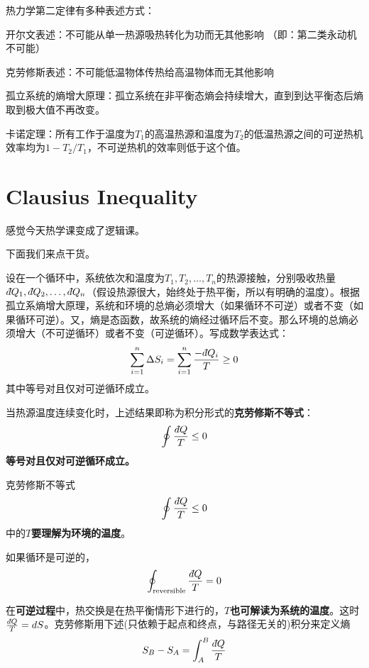 \documentclass[CJK]{beamer}
\begin{document}
\begin{frame}
\bch
热力学第二定律有多种表述方式：
\bitem
\item{开尔文表述：不可能从单一热源吸热转化为功而无其他影响 （即：第二类永动机不可能）}
\item{克劳修斯表述：不可能低温物体传热给高温物体而无其他影响}
\item{孤立系统的熵增大原理：孤立系统在非平衡态熵会持续增大，直到到达平衡态后熵取到极大值不再改变。}
\item{卡诺定理：所有工作于温度为$T_1$的高温热源和温度为$T_2$的低温热源之间的可逆热机效率均为$1-T_2/T_1$，不可逆热机的效率则低于这个值。}
\eitem
\ech
\end{frame}

\section{Clausius Inequality}

\begin{frame}
\bch
\wulian 感觉今天热学课变成了逻辑课。

\skiplines

下面我们来点干货。
\ech
\end{frame}

\begin{frame}
\bch
设在一个循环中，系统依次和温度为$T_1, T_2, \ldots, T_n$的热源接触，分别吸收热量$\dbar Q_1, \dbar Q_2, \ldots, \dbar Q_n$（假设热源很大，始终处于热平衡，所以有明确的温度）。根据孤立系熵增大原理，系统和环境的总熵必须增大（如果循环不可逆）或者不变（如果循环可逆）。又，熵是态函数，故系统的熵经过循环后不变。那么环境的总熵必须增大（不可逆循环）或者不变（可逆循环）。写成数学表达式：
$$\sum_{i=1}^n \Delta S_i = \sum_{i=1}^n \frac{-\dbar Q_i}{T} \ge 0$$
其中等号对且仅对可逆循环成立。

当热源温度连续变化时，上述结果即称为积分形式的{\bf 克劳修斯不等式}：
{\blue $$\oint \frac{\dbar Q}{T} \le 0 $$}
{\bf 等号对且仅对可逆循环成立。}

\ech
\end{frame}

\begin{frame}
\bch
克劳修斯不等式
{\blue $$\oint \frac{\dbar Q}{T} \le 0 $$}
中的{\bf $T$要理解为环境的温度}。

如果循环是可逆的，
$$\oint_{\rm reversible} \frac{\dbar Q}{T} = 0$$

在{\bf 可逆过程}中，热交换是在热平衡情形下进行的，{\bf $T$也可解读为系统的温度}。这时$\frac{\dbar Q}{T} = dS$。克劳修斯用下述(只依赖于起点和终点，与路径无关的)积分来定义熵
$$S_B-S_A = \int_A^B \frac{\dbar Q}{T} $$

\ech
\end{frame}
\end{document}
